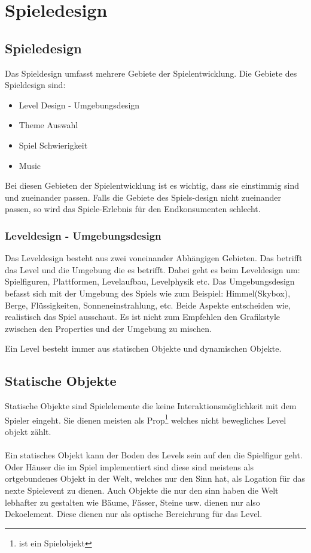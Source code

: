 \pagebreak
{}
\chapter{Spieledesign}
\section{Spieledesign}

Das Spieldesign umfasst mehrere Gebiete der Spielentwicklung. Die Gebiete des Spieldesign sind:

\begin{itemize}
    \item Level Design - Umgebungsdesign 
    \item Theme Auswahl 
    \item Spiel Schwierigkeit 
    \item Music 
\end{itemize}

Bei diesen Gebieten der Spielentwicklung ist es wichtig, dass sie einstimmig sind und zueinander passen. Falls die Gebiete des Spiels-design nicht zueinander passen, so wird das Spiele-Erlebnis für den Endkonsumenten schlecht. 

\subsection{Leveldesign - Umgebungsdesign}
Das Leveldesign besteht aus zwei voneinander Abhängigen Gebieten. Das betrifft das Level und die Umgebung die es betrifft. Dabei geht es beim Leveldesign um: Spielfiguren, Plattformen, Levelaufbau, Levelphysik etc. 
Das Umgebungsdesign befasst sich mit der Umgebung des Spiels wie zum Beispiel: Himmel(Skybox), Berge, Flüssigkeiten, Sonneneinstrahlung, etc. 
Beide Aspekte entscheiden wie, realistisch das Spiel ausschaut. Es ist nicht zum Empfehlen den Grafikstyle zwischen den Properties und der Umgebung zu mischen.

Ein Level besteht immer aus statischen Objekte und dynamischen Objekte.

\section{Statische Objekte}
Statische Objekte sind Spielelemente die keine Interaktionsmöglichkeit mit dem Spieler eingeht. Sie dienen meisten als Prop\footnote[1]{ist ein Spielobjekt} welches nicht bewegliches Level objekt zählt. \\\\
Ein statisches Objekt kann der Boden des Levels sein auf den die Spielfigur geht. Oder Häuser die im Spiel implementiert sind diese sind meistens als ortgebundenes Objekt in der Welt, welches nur den Sinn hat, als Logation für das nexte Spielevent zu dienen. Auch Objekte die nur den sinn haben die Welt lebhafter zu gestalten wie Bäume, Fässer, Steine usw. dienen nur also Dekoelement. Diese dienen nur als optische Bereichrung für das Level. 

